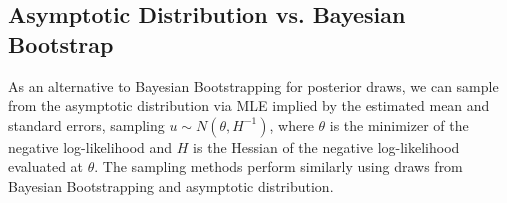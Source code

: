 \documentclass[nonblindrev]{informs3}
\begin{document}
\begin{APPENDICES}

\subsection{Asymptotic Distribution vs. Bayesian Bootstrap}

As an alternative to Bayesian Bootstrapping for posterior draws, we can sample from the asymptotic distribution via MLE implied by the estimated mean and standard errors, sampling $u \sim N(\theta,H^{-1})$, where $\theta$ is the minimizer of the negative log-likelihood and $H$ is the Hessian of the negative log-likelihood evaluated at $\theta$. The sampling methods perform similarly using draws from Bayesian Bootstrapping and asymptotic distribution.


\end{APPENDICES}
\end{document}
